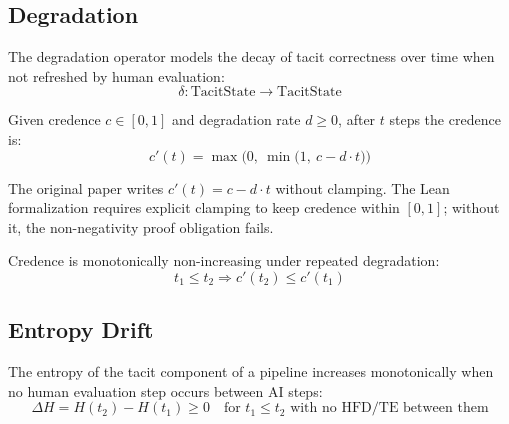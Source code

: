 \subsection{Degradation}

\begin{definition}
The degradation operator models the decay of tacit correctness over time when
not refreshed by human evaluation:
\[
  \delta : \mathrm{TacitState} \to \mathrm{TacitState}
\]
\end{definition}

\begin{definition}
Given credence $c \in [0,1]$ and degradation rate $d \geq 0$, after $t$ steps
the credence is:
\[
  c'(t) = \max\!\Big(0,\ \min\!\Big(1,\ c - d \cdot t\Big)\Big)
\]
\end{definition}

\begin{correction}
The original paper writes $c'(t) = c - d \cdot t$ without clamping. The Lean
formalization requires explicit clamping to keep credence within $[0,1]$; without
it, the non-negativity proof obligation fails.
\end{correction}

\begin{theorem}
Credence is monotonically non-increasing under repeated degradation:
\[
  t_1 \leq t_2 \Rightarrow c'(t_2) \leq c'(t_1)
\]
\end{theorem}

\subsection{Entropy Drift}

\begin{definition}
The entropy of the tacit component of a pipeline increases monotonically when no
human evaluation step occurs between AI steps:
\[
  \Delta H = H(t_2) - H(t_1) \geq 0 \quad
  \text{for } t_1 \leq t_2 \text{ with no HFD/TE between them}
\]
\end{definition}

